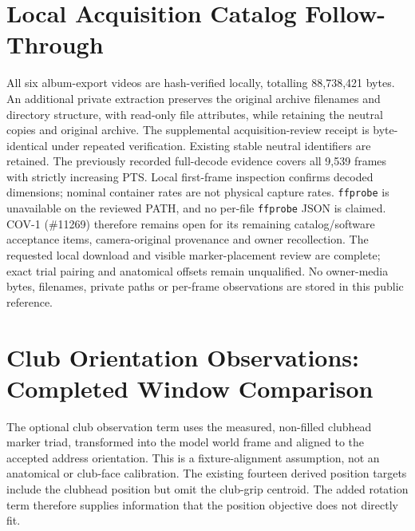\documentclass[11pt,a4paper]{article}
\begin{document}
\section{Local Acquisition Catalog Follow-Through}
\label{sec:local-acquisition-follow-through}
All six album-export videos are hash-verified locally, totalling
88,738,421 bytes. An additional private extraction preserves the original
archive filenames and directory structure, with read-only file attributes,
while retaining the neutral copies and original archive. The supplemental
acquisition-review receipt is byte-identical under repeated verification.
Existing stable neutral identifiers are retained. The previously recorded
full-decode evidence covers all 9,539 frames with strictly increasing PTS.
Local first-frame inspection confirms decoded dimensions; nominal container
rates are not physical capture rates. \texttt{ffprobe} is unavailable on the
reviewed PATH, and no per-file \texttt{ffprobe} JSON is claimed. COV-1
(\#11269) therefore remains open for its remaining catalog/software
acceptance items, camera-original provenance and owner recollection.
The requested local download and visible marker-placement review are
complete; exact trial pairing and anatomical offsets remain unqualified.
No owner-media bytes, filenames, private paths or per-frame observations
are stored in this public reference.
\section{Club Orientation Observations: Completed Window Comparison}
\label{sec:club-window-comparison}
The optional club observation term uses the measured, non-filled clubhead
marker triad, transformed into the model world frame and aligned to the
accepted address orientation. This is a fixture-alignment assumption, not
an anatomical or club-face calibration. The existing fourteen derived
position targets include the clubhead position but omit the club-grip
centroid. The added rotation term therefore supplies information that the
position objective does not directly fit.
\end{document}
